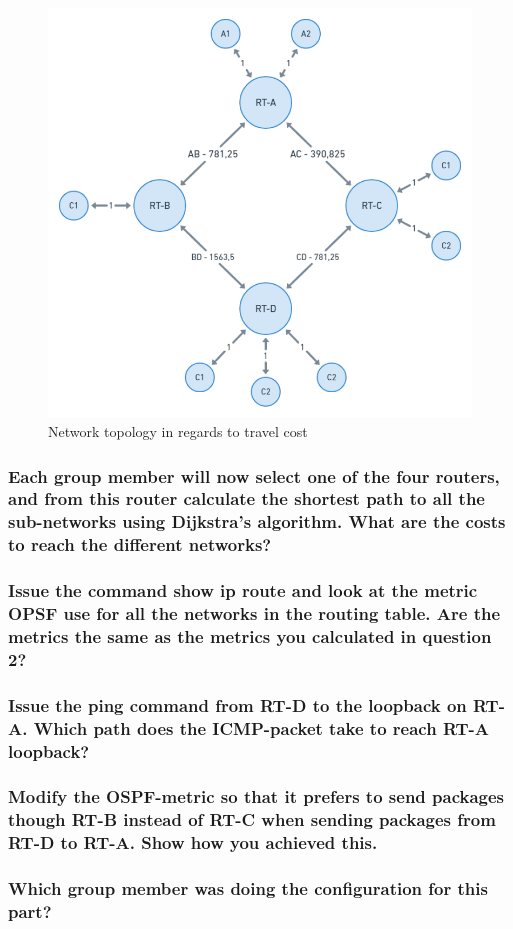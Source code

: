 \documentclass[a4paper, titlepage,12pt]{article}
\begin{document}
		\begin{figure}[H]
			\begin{center}
				\includegraphics[scale=0.30]{./djikstra_manual.png}
			\end{center}
			\caption{Network topology in regards to travel cost}
		\end{figure}

		\subsubsection{Each group member will now select one of the four routers, and from this router calculate the shortest path to all the sub-networks using Dijkstra's algorithm. What are the costs to reach the different networks?}

		\subsubsection{Issue the command show ip route and look at the metric OPSF use for all the networks in the routing table. Are the metrics the same as the metrics you calculated in question 2?}

		\subsubsection{Issue the ping command from RT-D to the loopback on RT-A. Which path does the ICMP-packet take to reach RT-A loopback?}

		\subsubsection{Modify the OSPF-metric so that it prefers to send packages though RT-B instead of RT-C when sending packages from RT-D to RT-A. Show how you achieved this.}

		\subsubsection{Which group member was doing the configuration for this part?}
\end{document}
